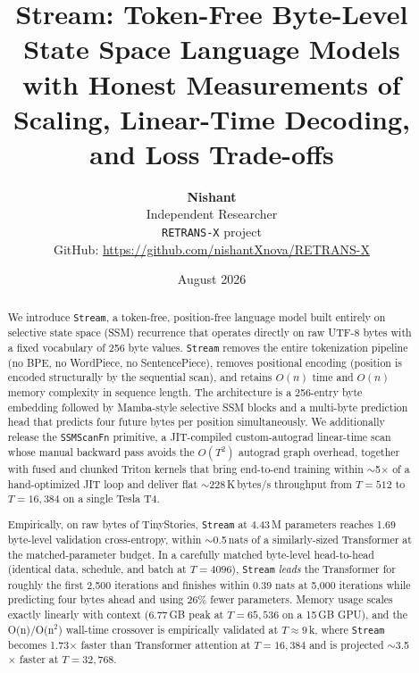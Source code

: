 \documentclass[11pt]{article}
\title{\bfseries Stream: Token-Free Byte-Level State Space Language Models\\
       \large with Honest Measurements of Scaling, Linear-Time Decoding, and Loss Trade-offs}
\author{
  \textbf{Nishant}\\[2pt]
  \normalsize Independent Researcher \\[2pt]
  \normalsize \texttt{RETRANS-X} project \\[4pt]
  \normalsize GitHub: \url{https://github.com/nishantXnova/RETRANS-X}
}
\date{August 2026}
\newcommand{\Stream}{\texttt{Stream}}
\begin{document}
\maketitle

\begin{abstract}
\noindent
We introduce \Stream{}, a token-free, position-free language model built entirely
on selective state space (SSM) recurrence that operates directly on raw UTF-8
bytes with a fixed vocabulary of 256 byte values. \Stream{} removes the entire
tokenization pipeline (no BPE, no WordPiece, no SentencePiece), removes
positional encoding (position is encoded structurally by the sequential scan),
and retains $O(n)$ time and $O(n)$ memory complexity in sequence length. The
architecture is a 256-entry byte embedding followed by Mamba-style selective
SSM blocks and a multi-byte prediction head that predicts four future bytes per
position simultaneously. We additionally release the \texttt{SSMScanFn} primitive,
a JIT-compiled custom-autograd linear-time scan whose manual backward pass avoids
the $O(T^2)$ autograd graph overhead, together with fused and chunked Triton
kernels that bring end-to-end training within $\sim$5$\times$ of a hand-optimized
JIT loop and deliver flat $\sim$228\,K\,bytes/s throughput from $T=512$ to
$T=16{,}384$ on a single Tesla T4.

Empirically, on raw bytes of TinyStories, \Stream{} at 4.43\,M parameters reaches
1.69 byte-level validation cross-entropy, within $\sim$0.5\,nats of a
similarly-sized Transformer at the matched-parameter budget. In a carefully
matched byte-level head-to-head (identical data, schedule, and batch at
$T=4096$), \Stream{} \emph{leads} the Transformer for roughly the first 2{,}500
iterations and finishes within 0.39 nats at 5{,}000 iterations while predicting
four bytes ahead and using 26\% fewer parameters. Memory usage scales exactly
linearly with context (6.77\,GB peak at $T=65{,}536$ on a 15\,GB GPU), and the
O(n)/O(n$^2$) wall-time crossover is empirically validated at $T\approx 9$\,k,
where \Stream{} becomes 1.73$\times$ faster than Transformer attention at
$T=16{,}384$ and is projected $\sim$3.5$\times$ faster at $T=32{,}768$.


\end{abstract}
\end{document}
